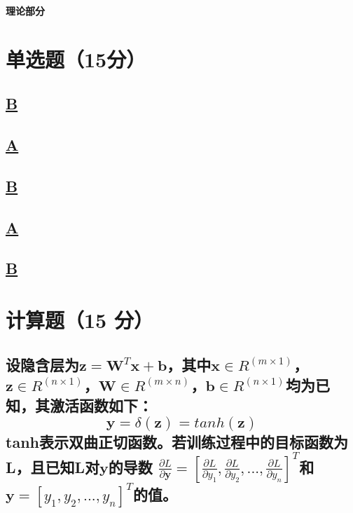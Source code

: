 \documentclass[a4paper]{article}
\begin{document}
\courseheader
\vspace{3mm}
\centerline{\textbf{\Large{理论部分}}}

\section{单选题（15分）}
\subsection{\underline{B}}

\subsection{\underline{A}}

\subsection{\underline{B}}

\subsection{\underline{A}}

\subsection{\underline{B}}

\section{计算题（15 分）}
\subsection{设隐含层为$\mathbf{z}=\mathbf{W}^T\mathbf{x}+\mathbf{b}$，其中$\mathbf{x}\in R^{(m \times 1)}$，$\mathbf{z}\in R^{(n\times 1)}$，$\mathbf{W}\in R^{(m\times n)}$，$\mathbf{b} \in R^{(n\times 1)}$均为已知，其激活函数如下：
$$\mathbf{y}=\delta(\mathbf{z})=tanh(\mathbf{z})$$
tanh表示双曲正切函数。若训练过程中的目标函数为L，且已知L对$\mathbf{y}$的导数 $\frac{\partial L}{\partial \mathbf{y}}=[\frac{\partial L}{\partial y_1},\frac{\partial L}{\partial y_2},...,\frac{\partial L}{\partial y_n}]^T$和$\mathbf{y}=[y_1,y_2,...,y_n]^T$的值。}
\end{document}
